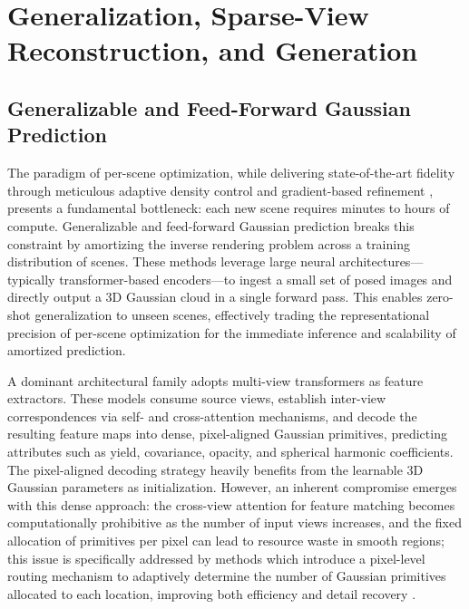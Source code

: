 \documentclass[11pt,a4paper]{article}
\begin{document}
\section{Generalization, Sparse-View Reconstruction, and Generation}



\subsection{Generalizable and Feed-Forward Gaussian Prediction}


The paradigm of per-scene optimization, while delivering state-of-the-art fidelity through meticulous adaptive density control and gradient-based refinement \cite{arxiv:2308.04079v1}, presents a fundamental bottleneck: each new scene requires minutes to hours of compute. Generalizable and feed-forward Gaussian prediction breaks this constraint by amortizing the inverse rendering problem across a training distribution of scenes. These methods leverage large neural architectures---typically transformer-based encoders---to ingest a small set of posed images and directly output a 3D Gaussian cloud in a single forward pass. This enables zero-shot generalization to unseen scenes, effectively trading the representational precision of per-scene optimization for the immediate inference and scalability of amortized prediction.

A dominant architectural family adopts multi-view transformers as feature extractors. These models consume source views, establish inter-view correspondences via self- and cross-attention mechanisms, and decode the resulting feature maps into dense, pixel-aligned Gaussian primitives, predicting attributes such as yield, covariance, opacity, and spherical harmonic coefficients. The pixel-aligned decoding strategy heavily benefits from the learnable 3D Gaussian parameters as initialization. However, an inherent compromise emerges with this dense approach: the cross-view attention for feature matching becomes computationally prohibitive as the number of input views increases, and the fixed allocation of primitives per pixel can lead to resource waste in smooth regions; this issue is specifically addressed by methods which introduce a pixel-level routing mechanism to adaptively determine the number of Gaussian primitives allocated to each location, improving both efficiency and detail recovery \cite{arxiv:2605.07287v2}.
\end{document}
